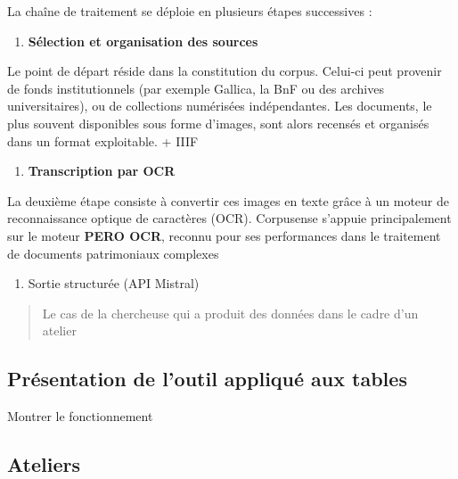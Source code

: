 La chaîne de traitement se déploie en plusieurs étapes successives :

\begin{enumerate}
\item \textbf{Sélection et organisation des sources}  
\end{enumerate}
   Le point de départ réside dans la constitution du corpus. Celui-ci peut provenir de fonds institutionnels (par exemple Gallica, la BnF ou des archives universitaires), ou de collections numérisées indépendantes. Les documents, le plus souvent disponibles sous forme d’images, sont alors recensés et organisés dans un format exploitable. + IIIF

\begin{enumerate}
\item \textbf{Transcription par OCR}  
\end{enumerate}
   La deuxième étape consiste à convertir ces images en texte grâce à un moteur de reconnaissance optique de caractères (OCR). Corpusense s’appuie principalement sur le moteur \textbf{PERO OCR}, reconnu pour ses performances dans le traitement de documents patrimoniaux complexes

\begin{enumerate}
\item Sortie structurée (API Mistral)

\end{enumerate}
\begin{quote}
Le cas de la chercheuse qui a produit des données dans le cadre d'un atelier

\end{quote}
\subsection{Présentation de l'outil appliqué aux tables}

Montrer le fonctionnement

\subsection{Ateliers}

